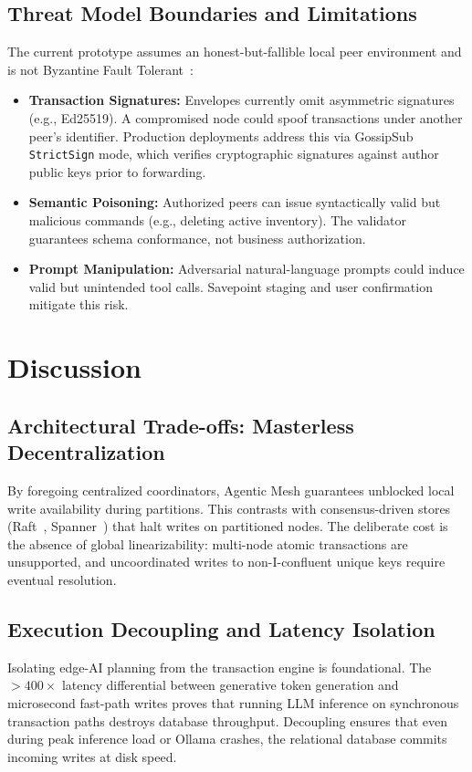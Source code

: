 \subsection{Threat Model Boundaries and Limitations}
The current prototype assumes an honest-but-fallible local peer environment and is not Byzantine Fault Tolerant~\cite{castro1999practical}:
\begin{itemize}
    \item \textbf{Transaction Signatures:} Envelopes currently omit asymmetric signatures (e.g., Ed25519). A compromised node could spoof transactions under another peer's identifier. Production deployments address this via GossipSub \texttt{StrictSign} mode, which verifies cryptographic signatures against author public keys prior to forwarding.
    \item \textbf{Semantic Poisoning:} Authorized peers can issue syntactically valid but malicious commands (e.g., deleting active inventory). The validator guarantees schema conformance, not business authorization.
    \item \textbf{Prompt Manipulation:} Adversarial natural-language prompts could induce valid but unintended tool calls. Savepoint staging and user confirmation mitigate this risk.
\end{itemize}

\section{Discussion}
\label{sec:discussion}

\subsection{Architectural Trade-offs: Masterless Decentralization}
By foregoing centralized coordinators, Agentic Mesh guarantees unblocked local write availability during partitions. This contrasts with consensus-driven stores (Raft~\cite{ongaro2014raft}, Spanner~\cite{corbett2013spanner}) that halt writes on partitioned nodes. The deliberate cost is the absence of global linearizability: multi-node atomic transactions are unsupported, and uncoordinated writes to non-I-confluent unique keys require eventual resolution.

\subsection{Execution Decoupling and Latency Isolation}
Isolating edge-AI planning from the transaction engine is foundational. The $>400\times$ latency differential between generative token generation and microsecond fast-path writes proves that running LLM inference on synchronous transaction paths destroys database throughput. Decoupling ensures that even during peak inference load or Ollama crashes, the relational database commits incoming writes at disk speed.

